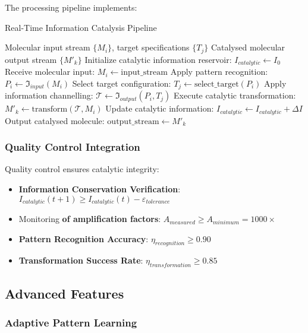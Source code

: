 \documentclass[12pt,a4paper]{article}
\begin{document}
The processing pipeline implements:

\begin{algorithm}[H]
\caption{Real-Time Information Catalysis Pipeline}
\begin{algorithmic}[1]
\REQUIRE Molecular input stream $\{M_i\}$, target specifications $\{T_j\}$
\ENSURE Catalysed molecular output stream $\{M'_k\}$
\STATE Initialize catalytic information reservoir: $I_{catalytic} \leftarrow I_0$
    \STATE Receive molecular input: $M_i \leftarrow \text{input\_stream}$
    \STATE Apply pattern recognition: $P_i \leftarrow \mathfrak{I}_{input}(M_i)$
    \STATE Select target configuration: $T_j \leftarrow \text{select\_target}(P_i)$
    \STATE Apply information channelling: $\mathcal{T} \leftarrow \mathfrak{I}_{output}(P_i, T_j)$
    \STATE Execute catalytic transformation: $M'_k \leftarrow \text{transform}(\mathcal{T}, M_i)$
    \STATE Update catalytic information: $I_{catalytic} \leftarrow I_{catalytic} + \Delta I$
    \STATE Output catalysed molecule: $\text{output\_stream} \leftarrow M'_k$
\ENDWHILE
\end{algorithmic}
\end{algorithm}

\subsubsection{Quality Control Integration}

Quality control ensures catalytic integrity:

\begin{itemize}
\item \textbf{Information Conservation Verification}: $I_{catalytic}(t+1) \geq I_{catalytic}(t) - \varepsilon_{tolerance}$
\item Monitoring \textbf{of amplification factors}: $A_{measured} \geq A_{minimum} = 1000\times$
\item \textbf{Pattern Recognition Accuracy}: $\eta_{recognition} \geq 0.90$
\item \textbf{Transformation Success Rate}: $\eta_{transformation} \geq 0.85$
\end{itemize}

\subsection{Advanced Features}

\subsubsection{Adaptive Pattern Learning}
\end{document}
